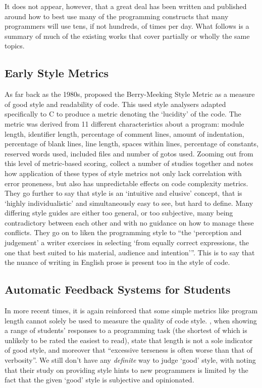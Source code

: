 \documentclass{article}
\begin{document}
    It does not appear, however, that a great deal has been written and published around how to best use many of the programming constructs that many programmers will use tens, if not hundreds, of times per day. What follows is a summary of much of the existing works that cover partially or wholly the same topics.

    \subsection{Early Style Metrics}
        As far back as the 1980s, \cite{berryMeekingStyle} proposed the Berry-Meeking Style Metric as a measure of good style and readability of code. This used style analysers adapted specifically to C to produce a metric denoting the `lucidity' of the code. The metric was derived from 11 different characteristics about a program: module length, identifier length, percentage of comment lines, amount of indentation, percentage of blank lines, line length, spaces within lines, percentage of constants, reserved words used, included files and number of gotos used. Zooming out from this level of metric-based scoring, \cite{paradigmForStyleResearch} collect a number of studies together and notes how application of these types of style metrics not only lack correlation with error proneness, but also has unpredictable effects on code complexity metrics. They go further to say that style is an `intuitive and elusive' concept, that is `highly individualistic' and simultaneously easy to see, but hard to define. Many differing style guides are either too general, or too subjective, many being contradictory between each other and with no guidance on how to manage these conflicts. They go on to liken the programming style to ``the `perception and judgement' a writer exercises in selecting `from equally correct expressions, the one that best suited to his material, audience and intention'''. This is to say that the nuance of writing in English prose is present too in the style of code.

    \subsection{Automatic Feedback Systems for Students}
        In more recent times, it is again reinforced that some simple metrics like program length cannot solely be used to measure the quality of code style. \cite{autoStyleFeedbackAtScale}, when showing a range of students' responses to a programming task (the shortest of which is unlikely to be rated the easiest to read), state that length is not a sole indicator of good style, and moreover that ``excessive terseness is often worse than that of verbosity''. We still don't have any \emph{definite} way to judge `good' style, with \cite{scaleDrivenHints} noting that their study on providing style hints to new programmers is limited by the fact that the given `good' style is subjective and opinionated.
\end{document}
